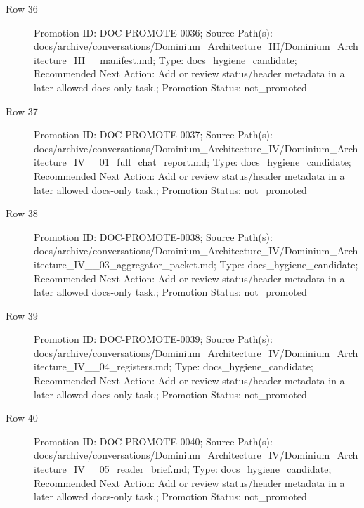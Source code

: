\documentclass[10.5pt,a4paper,openany]{book}
\begin{document}
\begin{description}
\item[Row 36] Promotion ID: DOC-\allowbreak{}PROMOTE-\allowbreak{}0036; Source Path(s): docs/\allowbreak{}archive/\allowbreak{}conversations/\allowbreak{}Dominium\_\allowbreak{}Architecture\_\allowbreak{}III/\allowbreak{}Dominium\_\allowbreak{}Architecture\_\allowbreak{}III\_\allowbreak{}\_\allowbreak{}manifest.\allowbreak{}md; Type: docs\_\allowbreak{}hygiene\_\allowbreak{}candidate; Recommended Next Action: Add or review status/\allowbreak{}header metadata in a later allowed docs-\allowbreak{}only task.\allowbreak{}; Promotion Status: not\_\allowbreak{}promoted
\item[Row 37] Promotion ID: DOC-\allowbreak{}PROMOTE-\allowbreak{}0037; Source Path(s): docs/\allowbreak{}archive/\allowbreak{}conversations/\allowbreak{}Dominium\_\allowbreak{}Architecture\_\allowbreak{}IV/\allowbreak{}Dominium\_\allowbreak{}Architecture\_\allowbreak{}IV\_\allowbreak{}\_\allowbreak{}01\_\allowbreak{}full\_\allowbreak{}chat\_\allowbreak{}report.\allowbreak{}md; Type: docs\_\allowbreak{}hygiene\_\allowbreak{}candidate; Recommended Next Action: Add or review status/\allowbreak{}header metadata in a later allowed docs-\allowbreak{}only task.\allowbreak{}; Promotion Status: not\_\allowbreak{}promoted
\item[Row 38] Promotion ID: DOC-\allowbreak{}PROMOTE-\allowbreak{}0038; Source Path(s): docs/\allowbreak{}archive/\allowbreak{}conversations/\allowbreak{}Dominium\_\allowbreak{}Architecture\_\allowbreak{}IV/\allowbreak{}Dominium\_\allowbreak{}Architecture\_\allowbreak{}IV\_\allowbreak{}\_\allowbreak{}03\_\allowbreak{}aggregator\_\allowbreak{}packet.\allowbreak{}md; Type: docs\_\allowbreak{}hygiene\_\allowbreak{}candidate; Recommended Next Action: Add or review status/\allowbreak{}header metadata in a later allowed docs-\allowbreak{}only task.\allowbreak{}; Promotion Status: not\_\allowbreak{}promoted
\item[Row 39] Promotion ID: DOC-\allowbreak{}PROMOTE-\allowbreak{}0039; Source Path(s): docs/\allowbreak{}archive/\allowbreak{}conversations/\allowbreak{}Dominium\_\allowbreak{}Architecture\_\allowbreak{}IV/\allowbreak{}Dominium\_\allowbreak{}Architecture\_\allowbreak{}IV\_\allowbreak{}\_\allowbreak{}04\_\allowbreak{}registers.\allowbreak{}md; Type: docs\_\allowbreak{}hygiene\_\allowbreak{}candidate; Recommended Next Action: Add or review status/\allowbreak{}header metadata in a later allowed docs-\allowbreak{}only task.\allowbreak{}; Promotion Status: not\_\allowbreak{}promoted
\item[Row 40] Promotion ID: DOC-\allowbreak{}PROMOTE-\allowbreak{}0040; Source Path(s): docs/\allowbreak{}archive/\allowbreak{}conversations/\allowbreak{}Dominium\_\allowbreak{}Architecture\_\allowbreak{}IV/\allowbreak{}Dominium\_\allowbreak{}Architecture\_\allowbreak{}IV\_\allowbreak{}\_\allowbreak{}05\_\allowbreak{}reader\_\allowbreak{}brief.\allowbreak{}md; Type: docs\_\allowbreak{}hygiene\_\allowbreak{}candidate; Recommended Next Action: Add or review status/\allowbreak{}header metadata in a later allowed docs-\allowbreak{}only task.\allowbreak{}; Promotion Status: not\_\allowbreak{}promoted

\end{description}
\end{document}
